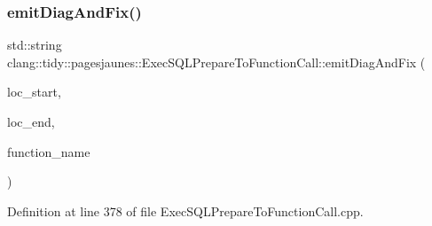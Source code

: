 \subsubsection{\texorpdfstring{emit\+Diag\+And\+Fix()}{emitDiagAndFix()}}
{\footnotesize\ttfamily std\+::string clang\+::tidy\+::pagesjaunes\+::\+Exec\+S\+Q\+L\+Prepare\+To\+Function\+Call\+::emit\+Diag\+And\+Fix (\begin{DoxyParamCaption}\item[{const Source\+Location \&}]{loc\+\_\+start,  }\item[{const Source\+Location \&}]{loc\+\_\+end,  }\item[{const std\+::string \&}]{function\+\_\+name }\end{DoxyParamCaption})}



Definition at line 378 of file Exec\+S\+Q\+L\+Prepare\+To\+Function\+Call.\+cpp.

